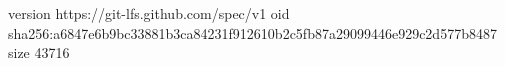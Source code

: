 version https://git-lfs.github.com/spec/v1
oid sha256:a6847e6b9bc33881b3ca84231f912610b2c5fb87a29099446e929c2d577b8487
size 43716
